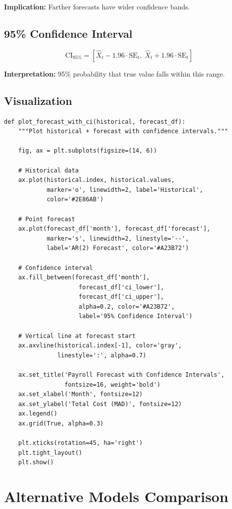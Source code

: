 \textbf{Implication:} Farther forecasts have wider confidence bands.

\subsection{95\% Confidence Interval}

$$\text{CI}_{95\%} = [\hat{X}_t - 1.96 \cdot \text{SE}_t, \; \hat{X}_t + 1.96 \cdot \text{SE}_t]$$

\textbf{Interpretation:} 95\% probability that true value falls within this range.

\subsection{Visualization}

\begin{lstlisting}[style=pythonstyle]
def plot_forecast_with_ci(historical, forecast_df):
    """Plot historical + forecast with confidence intervals."""
    
    fig, ax = plt.subplots(figsize=(14, 6))
    
    # Historical data
    ax.plot(historical.index, historical.values,
            marker='o', linewidth=2, label='Historical',
            color='#2E86AB')
    
    # Point forecast
    ax.plot(forecast_df['month'], forecast_df['forecast'],
            marker='s', linewidth=2, linestyle='--',
            label='AR(2) Forecast', color='#A23B72')
    
    # Confidence interval
    ax.fill_between(forecast_df['month'],
                     forecast_df['ci_lower'],
                     forecast_df['ci_upper'],
                     alpha=0.2, color='#A23B72',
                     label='95% Confidence Interval')
    
    # Vertical line at forecast start
    ax.axvline(historical.index[-1], color='gray',
               linestyle=':', alpha=0.7)
    
    ax.set_title('Payroll Forecast with Confidence Intervals',
                 fontsize=16, weight='bold')
    ax.set_xlabel('Month', fontsize=12)
    ax.set_ylabel('Total Cost (MAD)', fontsize=12)
    ax.legend()
    ax.grid(True, alpha=0.3)
    
    plt.xticks(rotation=45, ha='right')
    plt.tight_layout()
    plt.show()
\end{lstlisting}

\section{Alternative Models Comparison}

